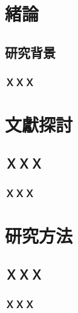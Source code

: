 \documentclass{ctexart}
\begin{document}
\renewcommand{\contentsname}{目次}
\tableofcontents
{} %
\newpage

\renewcommand{\listtablename}{表目次}
\listoftables
{} %
\newpage

\renewcommand{\listfigurename}{圖目次}
\listoffigures
{} %
\newpage

\makeatletter
\renewcommand{\l@figure}[2]{%
  \noindent\makebox[2.5em][l]{\figurename\  #1:} #2\par}
\makeatother

\setcounter{page}{1}

\section{緒論}

\subsection{研究背景}
\subsubsection{ＸＸＸ} 
 

\section{文獻探討}

\subsection{ＸＸＸ}
\subsubsection{ＸＸＸ} 


\section{研究方法}
\subsection{ＸＸＸ}
\subsubsection{ＸＸＸ}
\end{document}
